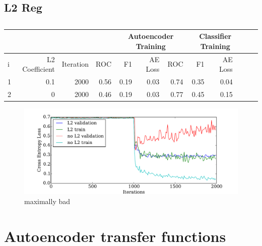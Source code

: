 \subsection{L2 Reg}
\begin{table}[!h] {\small \centering
\begin{tabular}{lrrrrrrrrrrr}
  &&& &  \multicolumn{3}{|c|}{Autoencoder Training} &  \multicolumn{3}{c|}{Classifier Training}    \\
\hline
 i &   L2 Coefficient &   Iteration &   ROC&F1&AE Loss & ROC & F1 & AE Loss \\
\hline
 1 &       0.1 & 2000 &    0.56 &   0.19 &     0.03 &    0.74 &   0.35 &     0.04\\
 2 &       0   & 2000 &    0.46 &   0.19 &     0.03 &    0.77 &   0.45 &     0.15\\
\hline
\end{tabular}\caption{} \label{tab:pseaafasfrch}} \end{table}

\begin{figure}[!h]
\centering
\includegraphics[width =0.8\hsize]{figures/l2.pdf}
\caption{maximally bad}
\label{fig:alpha_functions}
\end{figure}

\newpage
%
%
%
%
%
%
\section{Autoencoder transfer functions}

